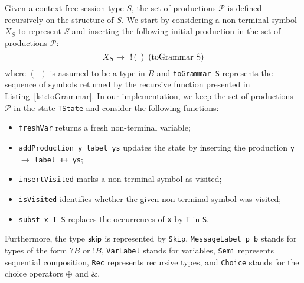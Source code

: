 Given a context-free session type $S$, the set of productions $\mathcal{P}$
is defined recursively on the structure of $S$. We start by considering
a non-terminal symbol $X_S$ to represent $S$ and inserting the following
initial production in the set of productions $\mathcal{P}$:
\begin{equation}
\label{initial_prod}
	X_S \rightarrow \enspace \initialProd\enspace \text{(\lstinline{toGrammar S})}
\end{equation}
where $( \enspace )$ is assumed to be a type in $B$ and
\lstinline{toGrammar S} represents the sequence of symbols returned by the
recursive function presented in Listing~\ref{lst:toGrammar}. In our implementation,
we keep the set of productions $\mathcal{P}$ in the state \lstinline{TState}
and consider the following functions:
\begin{itemize}
	\item \lstinline{freshVar} returns a fresh non-terminal variable;
	\item \lstinline{addProduction y label ys} updates the state by inserting
	      the production \lstinline{y} $\rightarrow$ \lstinline{label ++ ys};
	\item \lstinline{insertVisited} marks a non-terminal symbol as visited;
	\item \lstinline{isVisited} identifies whether the given non-terminal symbol
	      was visited;
	\item \lstinline{subst x T S} replaces the occurrences of \lstinline{x} by
	      \lstinline{T} in \lstinline{S}.
\end{itemize}
Furthermore, the type $\mathsf{skip}$ is represented by \lstinline{Skip},
\lstinline{MessageLabel p b} stands for types of the form $?B$ or $!B$,
\lstinline{VarLabel} stands for variables,
\lstinline{Semi} represents sequential composition,
\lstinline{Rec} represents recursive types, and
\lstinline{Choice} stands for the choice operators $\oplus$ and $\&$.

